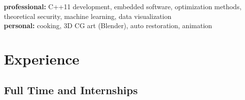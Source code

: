 \documentclass[]{friggeri-cv} %
\begin{document}
\textbf{professional:} C++11 development, embedded software, optimization methods, theoretical security, machine learning, data visualization \\ \textbf{personal:} cooking, 3D CG art (Blender), auto restoration, animation 



\section{Experience}

\subsection{Full Time and Internships}
\end{document}
